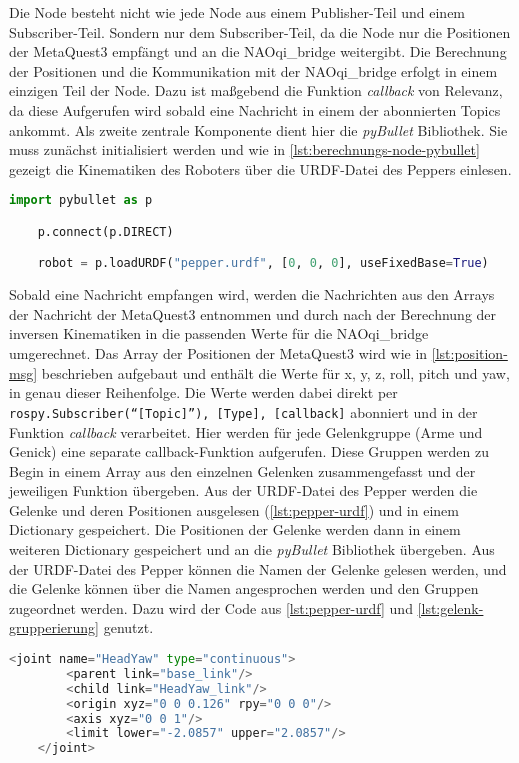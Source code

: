 Die Node besteht nicht wie jede Node aus einem Publisher-Teil und einem Subscriber-Teil. Sondern nur dem Subscriber-Teil, da die Node nur die Positionen der MetaQuest3 empfängt und an die NAOqi\_bridge weitergibt. Die Berechnung der Positionen und die Kommunikation mit der NAOqi\_bridge erfolgt in einem einzigen Teil der Node. Dazu ist maßgebend die Funktion \textit{callback} von Relevanz, da diese Aufgerufen wird sobald eine Nachricht in einem der abonnierten Topics ankommt. Als zweite zentrale Komponente dient hier die \textit{pyBullet} Bibliothek. Sie muss zunächst initialisiert werden und wie in \autoref{lst:berechnungs-node-pybullet} gezeigt die Kinematiken des Roboters über die \ac{URDF}-Datei des Peppers einlesen.\\
\begin{lstlisting}[language=Python, caption=Berechnungs-Node-Initialisierung von PyBullet, label=lst:berechnungs-node-pybullet]
    import pybullet as p

    p.connect(p.DIRECT)

    robot = p.loadURDF("pepper.urdf", [0, 0, 0], useFixedBase=True)
\end{lstlisting}
Sobald eine Nachricht empfangen wird, werden die Nachrichten aus den Arrays der Nachricht der MetaQuest3 entnommen und durch nach der Berechnung der inversen Kinematiken in die passenden Werte für die NAOqi\_bridge umgerechnet. Das Array der Positionen der MetaQuest3 wird wie in \autoref{lst:position-msg} beschrieben aufgebaut und enthält die Werte für x, y, z, roll, pitch und yaw, in genau dieser Reihenfolge. Die Werte werden dabei direkt per \texttt{rospy.Subscriber(``[Topic]''), [Type], [callback]} abonniert und in der Funktion \textit{callback} verarbeitet. Hier werden für jede Gelenkgruppe (Arme und Genick) eine separate callback-Funktion aufgerufen. Diese Gruppen werden zu Begin in einem Array aus den einzelnen Gelenken zusammengefasst und der jeweiligen Funktion übergeben. Aus der \ac{URDF}-Datei des Pepper werden die Gelenke und deren Positionen ausgelesen (\autoref{lst:pepper-urdf}) und in einem Dictionary gespeichert. Die Positionen der Gelenke werden dann in einem weiteren Dictionary gespeichert und an die \textit{pyBullet} Bibliothek übergeben. Aus der \ac{URDF}-Datei des Pepper können die Namen der Gelenke gelesen werden, und die Gelenke können über die Namen angesprochen werden und den Gruppen zugeordnet werden. Dazu wird der Code aus \autoref{lst:pepper-urdf} und \autoref{lst:gelenk-grupperierung} genutzt.\\
\begin{lstlisting}[language=Python, caption=Ausschnitt der URDF-Datei des Pepper, label=lst:pepper-urdf]
    <joint name="HeadYaw" type="continuous">
        <parent link="base_link"/>
        <child link="HeadYaw_link"/>
        <origin xyz="0 0 0.126" rpy="0 0 0"/>
        <axis xyz="0 0 1"/>
        <limit lower="-2.0857" upper="2.0857"/>
    </joint>
\end{lstlisting}

